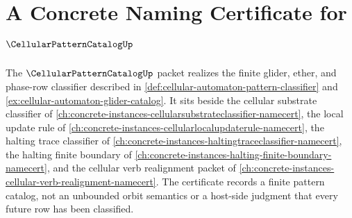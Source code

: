 \chapter{A Concrete Naming Certificate for $\CellularPatternCatalogUp$}
\label{ch:concrete-instances-cellularpatterncatalog-namecert}

The $\CellularPatternCatalogUp$ packet realizes the finite glider, ether, and phase-row classifier described in \autoref{def:cellular-automaton-pattern-classifier} and \autoref{ex:cellular-automaton-glider-catalog}. It sits beside the cellular substrate classifier of \autoref{ch:concrete-instances-cellularsubstrateclassifier-namecert}, the local update rule of \autoref{ch:concrete-instances-cellularlocalupdaterule-namecert}, the halting trace classifier of \autoref{ch:concrete-instances-haltingtraceclassifier-namecert}, the halting finite boundary of \autoref{ch:concrete-instances-halting-finite-boundary-namecert}, and the cellular verb realignment packet of \autoref{ch:concrete-instances-cellular-verb-realignment-namecert}. The certificate records a finite pattern catalog, not an unbounded orbit semantics or a host-side judgment that every future row has been classified.



